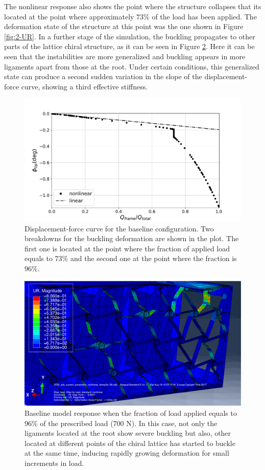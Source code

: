   The nonlinear response also shows the point where the structure collapses that its located at the point where approximately $73\%$ of the load has been applied. The deformation state of the structure at this point was the one shown in Figure \ref{fig:2-UR}. In a further stage of the simulation, the buckling propagates to other parts of the lattice chiral structure, as it can be seen in Figure \ref{fig:3-UR}. Here it can be seen that the instabilities are more generalized and buckling appears in more ligaments apart from those at the root. Under certain conditions, this generalized state can produce a second sudden variation in the slope of the displacement-force curve, showing a third effective stiffness. 

  \begin{figure}[!htpb] %
    \centering
    \includegraphics[width=0.8 \textwidth]{../figures/result-sim/forceDisplacement-far}
    \caption[Displacement-force curve for the baseline configuration]{Displacement-force curve for the baseline configuration. Two breakdowns for the buckling deformation are shown in the plot. The first one is located at the point where the fraction of applied load equals to $73\%$ and the second one at the point where the fraction is $96\%$.}\label{fig:forceDisplacement-far}
  \end{figure}

  \begin{figure}[!htpb] %
    \centering
    \includegraphics[width=0.8 \textwidth]{../figures/result-sim/3-UR}
    \caption[Baseline model response when the fraction of load applied equals to 96\% of the prescribed load (700 N)]{Baseline model response when the fraction of load applied equals to 96\% of the prescribed load (700 N). In this case, not only the ligaments located at the root show severe buckling but also, other located at different points of the chiral lattice has started to buckle at the same time, inducing rapidly growing deformation for small increments in load.}\label{fig:3-UR}
  \end{figure}

